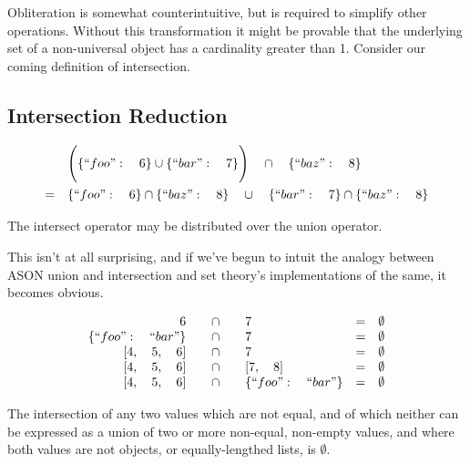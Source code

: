 \documentclass[letterpaper]{article}
\begin{document}
Obliteration is somewhat counterintuitive, but is required to simplify other
operations. Without this transformation it might be provable that the
underlying set of a non-universal object has a cardinality greater than 1.
Consider our coming definition of intersection.

\subsection{Intersection Reduction}

\begin{prule}
\label{sec:interdist}
\begin{equation}
\begin{split}
& \Bigg( \{``foo":\quad6\} \cup \{``bar":\quad7\} \Bigg) \quad \cap \quad
\{``baz":\quad8\} \\
= \quad& \{``foo":\quad6\} \cap \{``baz":\quad8\} \quad \cup \quad \{``bar":\quad7\}
 \cap \{``baz":\quad8\}
\end{split}
\end{equation}

The intersect operator may be distributed over the union operator.
\end{prule}

This isn't at all surprising, and if we've begun to intuit the analogy between
ASON union and intersection and set theory's implementations of the same, it
becomes obvious.

\begin{prule}
\label{sec:interelim}
\begin{equation}
\begin{array}{rclcl}
6 \quad&\cap&\quad 7 & = & \emptyset \\
\{``foo":\quad``bar"\} \quad&\cap&\quad 7 & = & \emptyset \\
{[}4,\quad5,\quad6] \quad&\cap&\quad 7 & = & \emptyset \\
{[}4,\quad5,\quad6] \quad&\cap&\quad {[}7,\quad8] & = & \emptyset \\
{[}4,\quad5,\quad6] \quad&\cap&\quad \{``foo":\quad``bar"\} & = & \emptyset \\
\end{array}
\end{equation}

The intersection of any two values which are not equal, and of which neither
can be expressed as a union of two or more non-equal, non-empty values, and
where both values are not objects, or equally-lengthed lists, is \(\emptyset\).
\end{prule}
\end{document}
